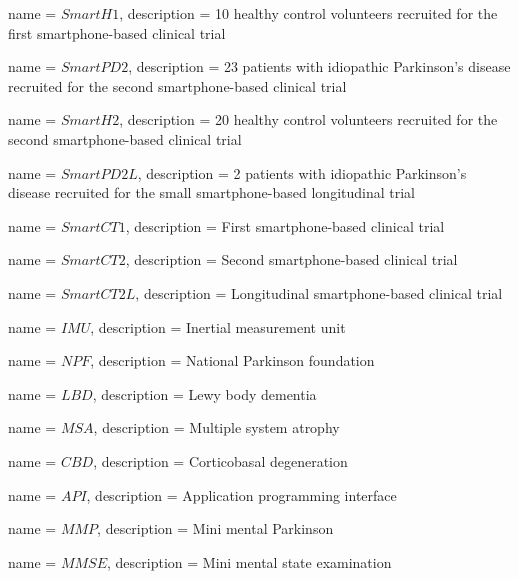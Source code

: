 {
	name = $SmartH1$, 
	description = 10 healthy control volunteers recruited for the first smartphone-based clinical trial
}

{
	name = $SmartPD2$, 
	description = 23 patients with idiopathic Parkinson's disease recruited for the second smartphone-based clinical trial
}

{
	name = $SmartH2$, 
	description = 20 healthy control volunteers recruited for the second smartphone-based clinical trial
}

{
	name = $SmartPD2L$, 
	description = 2 patients with idiopathic Parkinson's disease recruited for the small smartphone-based longitudinal trial
}

{
	name = $SmartCT1$, 
	description = First smartphone-based clinical trial
}

{
	name = $SmartCT2$, 
	description = Second smartphone-based clinical trial
}

{
	name = $SmartCT2L$, 
	description = Longitudinal smartphone-based clinical trial
}

{
	name = $IMU$, 
	description = Inertial measurement unit
}

{
	name = $NPF$, 
	description = National Parkinson foundation
}

{
	name = $LBD$, 
	description = Lewy body dementia
}

{
	name = $MSA$, 
	description = Multiple system atrophy
}

{
	name = $CBD$, 
	description = Corticobasal degeneration
}

{
	name = $API$, 
	description = Application programming interface
}

{
	name = $MMP$, 
	description = Mini mental Parkinson
}

{
	name = $MMSE$, 
	description = Mini mental state examination
}

\makenoidxglossaries